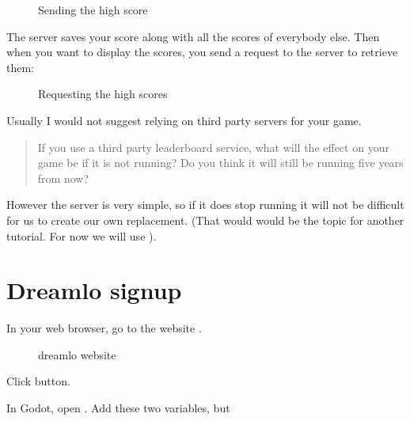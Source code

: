 \documentclass[letterpaper,10pt,english]{sphinxmanual}
\begin{document}
\begin{figure}[htbp]
\centering
\capstart

\noindent{}
\caption{Sending the high score}\label{\detokenize{tutorial:id5}}\end{figure}

\sphinxAtStartPar
The server saves your score along with all the scores of everybody else.
Then when you want to display the scores, you send a request to the
server to retrieve them:

\begin{figure}[htbp]
\centering
\capstart

\noindent{}
\caption{Requesting the high scores}\label{\detokenize{tutorial:id6}}\end{figure}

\sphinxAtStartPar
Usually I would not suggest relying on third party servers for your
game.
\begin{quote}

\sphinxAtStartPar
If you use a third party leaderboard service, what will the effect on
your game be if it is not running? Do you think it will still be
running five years from now?
\end{quote}

\sphinxAtStartPar
However the  server is very simple, so if it does stop running
it will not be difficult for us to create our own replacement. (That
would would be the topic for another tutorial. For now we will use
).


\section{Dreamlo sign\sphinxhyphen{}up}
\label{\detokenize{tutorial:dreamlo-sign-up}}
\sphinxAtStartPar
In your web browser, go to the website
.

\begin{figure}[htbp]
\centering
\capstart

\noindent{}
\caption{dreamlo website}\label{\detokenize{tutorial:id7}}\end{figure}

\sphinxAtStartPar
Click  button.

\sphinxAtStartPar
In Godot, open . Add these two variables, but 
\end{document}
